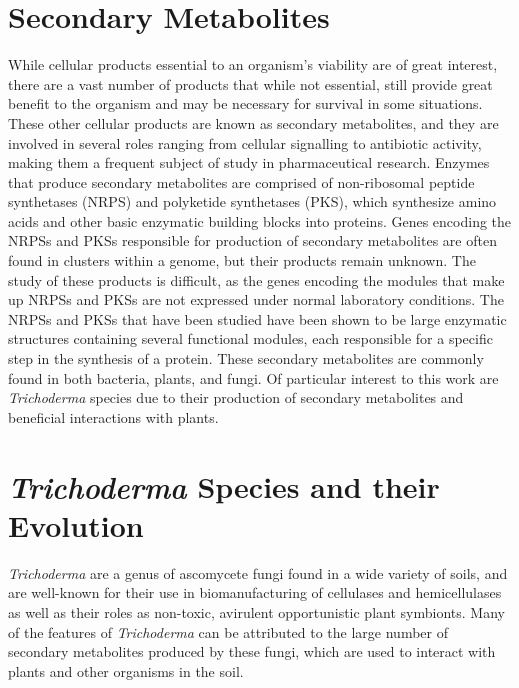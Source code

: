 \section{Secondary Metabolites}

While cellular products essential to an organism's viability are
of great interest, there are a vast number of products that while not
essential, still provide great benefit to the
organism and may be necessary for survival in some situations\cite{Craney2013}\cite{Mukherjee2012}. These other cellular products are known
 as secondary metabolites, and they are involved in several roles ranging 
 from cellular signalling to antibiotic activity, making them a frequent 
 subject of study in pharmaceutical research. Enzymes that produce 
 secondary metabolites are comprised of non-ribosomal peptide synthetases 
 (NRPS) and polyketide synthetases (PKS), which synthesize amino acids and 
 other basic enzymatic building blocks\cite{Komaki2020} into proteins. 
 Genes encoding the NRPSs and PKSs responsible for production of secondary 
 metabolites are often found in clusters within a genome, but their 
 products remain unknown\cite{Mukherjee2012}. 
 The study of these products is difficult, as the genes encoding the modules that make up NRPSs and PKSs are not expressed under normal laboratory conditions\cite{Mukherjee2012}. The NRPSs and PKSs that have been studied
 have been shown to be large enzymatic structures containing several 
 functional modules, each responsible for a specific step in the synthesis 
 of a protein\cite{Mukherjee2012}. These secondary metabolites are 
 commonly found in both bacteria, plants, and fungi. Of particular 
 interest to this work are \textit{Trichoderma} species due to their  
 production of secondary metabolites and beneficial interactions with 
 plants.

\section{\textit{Trichoderma} Species and their Evolution}

\textit{Trichoderma} are a genus of ascomycete fungi found in a wide
variety of soils, and are well-known for their use in biomanufacturing
of cellulases and hemicellulases as well as their roles as non-toxic,
avirulent opportunistic plant symbionts\cite{Woo2023}\cite{Kubicek2019}. 
Many of the features of \textit{Trichoderma}
can be attributed to the large number of secondary metabolites
produced by these fungi, which are used to interact with plants and other organisms in the soil\cite{Mukherjee2012}.

